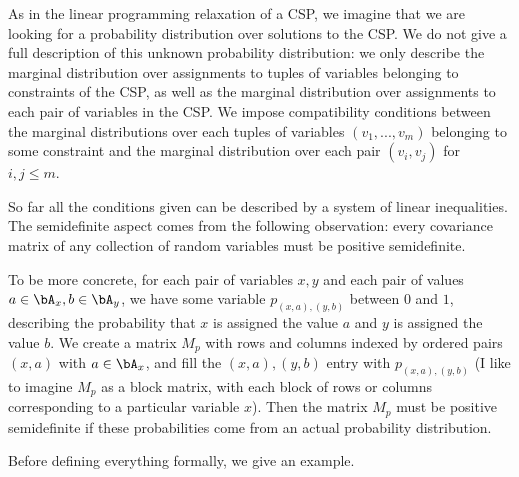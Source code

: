 As in the linear programming relaxation of a CSP, we imagine that we are looking for a probability distribution over solutions to the CSP. We do not give a full description of this unknown probability distribution: we only describe the marginal distribution over assignments to tuples of variables belonging to constraints of the CSP, as well as the marginal distribution over assignments to each pair of variables in the CSP. We impose compatibility conditions between the marginal distributions over each tuples of variables $(v_1, ..., v_m)$ belonging to some constraint and the marginal distribution over each pair $(v_i,v_j)$ for $i,j \le m$.

So far all the conditions given can be described by a system of linear inequalities. The semidefinite aspect comes from the following observation: every covariance matrix of any collection of random variables must be positive semidefinite.

To be more concrete, for each pair of variables $x,y$ and each pair of values $a \in \bA_x, b \in \bA_y$, we have some variable $p_{(x,a),(y,b)}$ between $0$ and $1$, describing the probability that $x$ is assigned the value $a$ and $y$ is assigned the value $b$. We create a matrix $M_p$ with rows and columns indexed by ordered pairs $(x,a)$ with $a \in \bA_x$, and fill the $(x,a),(y,b)$ entry with $p_{(x,a),(y,b)}$ (I like to imagine $M_p$ as a block matrix, with each block of rows or columns corresponding to a particular variable $x$). Then the matrix $M_p$ must be positive semidefinite if these probabilities come from an actual probability distribution.

Before defining everything formally, we give an example.

